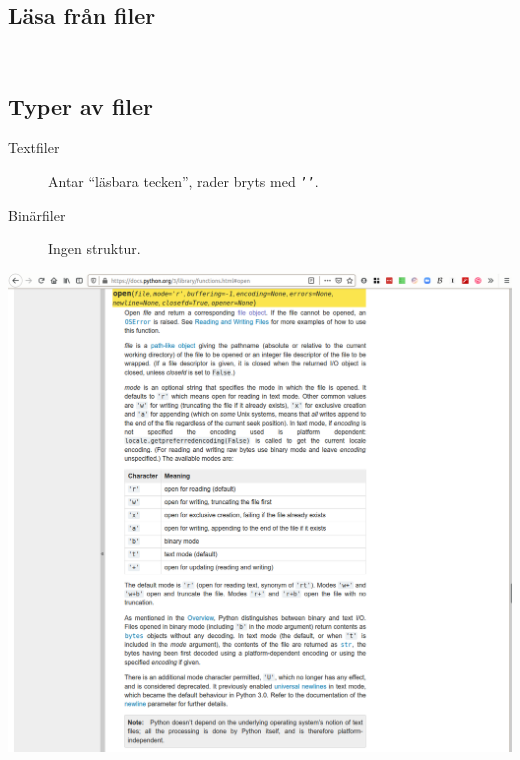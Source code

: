 \subsection{Läsa från filer}

\begin{frame}[fragile]
  \begin{example}
    \inputminted[firstline=3,lastline=9,firstnumber=3]{python}{examples/read_file.py}
  \end{example}
\end{frame}

\begin{frame}[fragile]
  \begin{example}
    \inputminted[firstline=11,lastline=18,firstnumber=11]{python}{examples/read_file.py}
  \end{example}
\end{frame}

\subsection{Typer av filer}

\begin{frame}
  \begin{remark}
    \begin{description}
      \item[Textfiler] Antar \enquote{läsbara tecken}, rader bryts med 
        \texttt{'\n'}.
      \item[Binärfiler] Ingen struktur.
    \end{description}
  \end{remark}
\end{frame}

\begin{frame}
  \includegraphics[width=\columnwidth]{figs/docs-open.png}
\end{frame}


